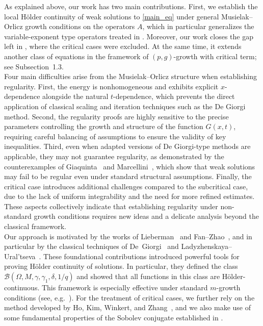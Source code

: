 \documentclass[10pt,reqno]{amsart}
\newcommand *\w{^\wedge}
\theoremstyle{definition}
\numberwithin{equation}{section}
\begin{document}
 As explained above, our work has two main contributions. First, we establish the local Hölder continuity of weak solutions to \eqref{main_eq} under general Musielak–Orlicz growth conditions on the operators $A$, which in particular generalizes the variable-exponent type operators treated in \cite{Fan1999}. Moreover, our work closes the gap left in \cite{Fan1999}, where the critical cases were excluded. At the same time, it extends another class of equations in the framework of $(p,g)$-growth with critical term; see Subsection~1.3.\\

Four main difficulties arise from the Musielak--Orlicz structure when establishing regularity.  
First, the energy is nonhomogeneous and exhibits explicit $x$-dependence alongside the natural $t$-dependence, which prevents the direct application of classical scaling and iteration techniques such as the De Giorgi method.  
Second, the regularity proofs are highly sensitive to the precise parameters controlling the growth and structure of the function $G(x,t)$, requiring careful balancing of assumptions to ensure the validity of key inequalities.  
Third, even when adapted versions of De Giorgi-type methods are applicable, they may not guarantee regularity, as demonstrated by the counterexamples of Giaquinta~\cite{MG2} and Marcellini~\cite{marc2, marc1}, which show that weak solutions may fail to be regular even under standard structural assumptions.  
Finally, the critical case introduces additional challenges compared to the subcritical case, due to the lack of uniform integrability and the need for more refined estimates.  
These aspects collectively indicate that establishing regularity under non-standard growth conditions requires new ideas and a delicate analysis beyond the classical framework.\\

Our approach is motivated by the works of Lieberman~\cite{Li1991} and Fan--Zhao~\cite{FanZhao1999}, and in particular by the classical techniques of De~Giorgi~\cite{deGiorgi1957} and Ladyzhenskaya--Ural'tseva~\cite{OL}. 
These foundational contributions introduced powerful tools for proving Hölder continuity of solutions. 
In particular, they defined the class $\mathcal{B}(\Omega, M, \gamma, \gamma_1, \delta, 1/q)$ and showed that all functions in this class are Hölder-continuous. 
This framework is especially effective under standard $m$-growth conditions (see, e.g.~\cite{MG1, MG3, OL, CM}). 
For the treatment of critical cases, we further rely on the method developed by Ho, Kim, Winkert, and Zhang~\cite{KKPZ}, and we also make use of some fundamental properties of the Sobolev conjugate established in \cite{Ala3}.
\end{document}
